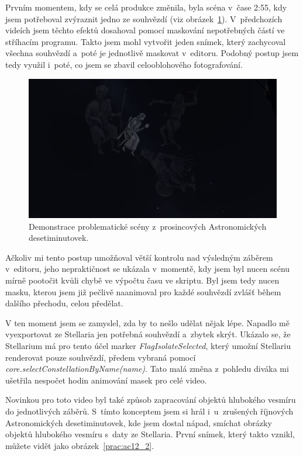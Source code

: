 \documentclass[12pt,a4paper,titlepage]{article}
\begin{document}
Prvním momentem, kdy se celá produkce změnila, byla scéna v~čase 2:55, kdy jsem potřeboval zvýraznit jedno ze souhvězdí (viz obrázek~\ref{prac:ac12_1}). V~předchozích videích jsem těchto efektů dosahoval pomocí maskování nepotřebných částí ve stříhacím programu. Takto jsem mohl vytvořit jeden snímek, který zachycoval všechna souhvězdí a~poté je jednotlivě maskovat v~editoru. Podobný postup jsem tedy využil i~poté, co jsem se zbavil celooblohového fotografování.

\begin{figure}[H]
	\centering
	\includegraphics[width=.95\textwidth]{ac12_1.png}
	\caption{Demonstrace problematické scény z~prosincových Astronomických desetiminutovek.}\label{prac:ac12_1}
\end{figure}

Ačkoliv mi tento postup umožňoval větší kontrolu nad výsledným záběrem v~editoru, jeho nepraktičnost se ukázala v~momentě, kdy jsem byl nucen scénu mírně pootočit kvůli chybě ve výpočtu času ve skriptu. Byl jsem tedy nucen masku, kterou jsem již pečlivě naanimoval pro každé souhvězdí zvlášť během dalšího přechodu, celou předělat.

V ten moment jsem se zamyslel, zda by to nešlo udělat nějak lépe. Napadlo mě vyexportovat ze Stellaria jen potřebná souhvězdí a~zbytek skrýt. Ukázalo se, že Stellarium má pro tento účel marker \textit{FlagIsolateSelected}, který umožní Stellariu renderovat pouze souhvězdí, předem vybraná pomocí \textit{core.\-select\-Constellation\-By\-Name(name)}. Tato malá změna z~pohledu diváka mi ušetřila nespočet hodin animování masek pro celé video. %

Novinkou pro toto video byl také způsob zapracování objektů hlubokého vesmíru do jednotlivých záběrů. S~tímto konceptem jsem si hrál i~u~zrušených říjnových Astronomických desetiminutovek, kde jsem dostal nápad, smíchat obrázky objektů hlubokého vesmíru s~daty ze Stellaria. První snímek, který takto vznikl, můžete vidět jako obrázek~\ref{prac:ac12_2}. 
\end{document}
